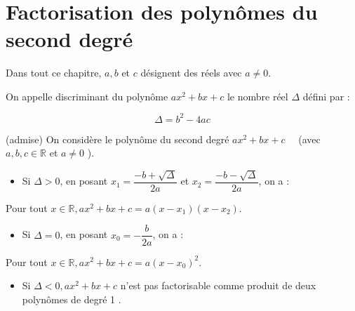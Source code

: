 \documentclass[12pt]{article}
\title{
\vspace{4em}
\centering
\tcbset{colframe=BlackSav,colback=GrayBG}
\tcbox[tikznode]{
Chapitre 1 \\ Polynômes du second degré 
}
}
\author{}
\date{}
\theoremstyle{break}
\begin{document}
\maketitle

\tableofcontents

\newcommand{\hideM}[1]{#1}
\newcommand{\hide}[1]{#1}


\newpage

\section{Factorisation des polynômes du second degré}
Dans tout ce chapitre, $a, b$ et $c$ désignent des réels avec $a \neq 0$.

\begin{definition}{}{}
On appelle discriminant du polynôme $a x^{2}+b x+c$ le nombre réel $\Delta$ défini par :

$$
\Delta=\hideM{b^{2}-4 a c}
$$
\end{definition}

\begin{proposition}{(admise)}{}
    On considère le polynôme du second degré $a x^{2}+b x+c \quad$ (avec $a, b, c \in \mathbb{R}$ et $a \neq 0$ ).
    
    \begin{itemize}
      \item Si $\Delta>0$, en posant $x_{1}=\hideM{\dfrac{-b+\sqrt{\Delta}}{2 a}}$ et $x_{2}=\hideM{\dfrac{-b-\sqrt{\Delta}}{2 a}}$, on a :
    \end{itemize}
    
    \hspace{10em} Pour tout $x \in \mathbb{R}, a x^{2}+b x+c=a\left(x-x_{1}\right)\left(x-x_{2}\right)$.
    
    \begin{itemize}
      \item Si $\Delta=0$, en posant $x_{0}=\hideM{-\dfrac{b}{2 a}}$, on a :
    \end{itemize}
    
    \hspace{10em} Pour tout $x \in \mathbb{R}, a x^{2}+b x+c=a\left(x-x_{0}\right)^{2}$.
    
    \begin{itemize}
      \item Si $\Delta<0, a x^{2}+b x+c$ n'est pas factorisable comme produit de deux polynômes de degré 1 .
    \end{itemize}
\end{proposition}
\end{document}
